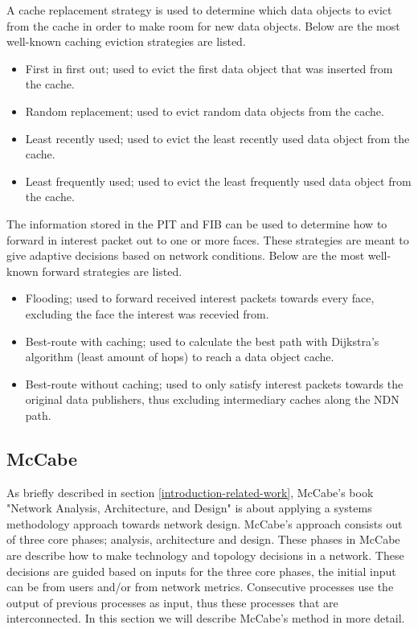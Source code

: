 A cache replacement strategy is used to determine which data objects to evict from the cache in order to make room for new data objects. Below are the most well-known caching eviction strategies are listed.
\begin{itemize}
    \item First in first out; used to evict the first data object that was inserted from the cache.
    \item Random replacement; used to evict random data objects from the cache.
    \item Least recently used; used to evict the least recently used data object from the cache.
    \item Least frequently used; used to evict the least frequently used data object from the cache.
\end{itemize}

The information stored in the PIT and FIB can be used to determine how to forward in interest packet out to one or more faces. These strategies are meant to give adaptive decisions based on network conditions. Below are the most well-known forward strategies are listed.
\begin{itemize}
    \item Flooding; used to forward received interest packets towards every face, excluding the face the interest was recevied from.
    \item Best-route with caching; used to calculate the best path with Dijkstra's algorithm (least amount of hops) to reach a data object cache.
    \item Best-route without caching; used to only satisfy interest packets towards the original data publishers, thus excluding intermediary caches along the NDN path. 
\end{itemize}

\subsection{McCabe}
\label{overview-mccabe}
As briefly described in section \ref{introduction-related-work}, McCabe's book "Network Analysis, Architecture, and Design" \cite{mccabe2010network} is about applying a systems methodology approach towards network design. McCabe's approach consists out of three core phases; analysis, architecture and design. These phases in McCabe are describe how to make technology and topology decisions in a network. These decisions are guided based on inputs for the three core phases, the initial input can be from users and/or from network metrics. Consecutive processes use the output of previous processes as input, thus these processes that are interconnected. In this section we will describe McCabe's method in more detail.

